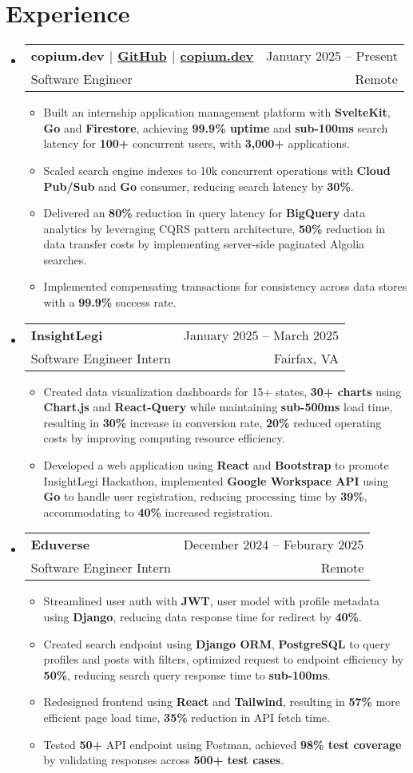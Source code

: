 \documentclass[letterpaper,11pt]{article}
\makeatletter
\newcommand{\resumeItem}[1]{
  \item\small{
    {#1 \vspace{0pt}}
  }
}
\newcommand{\resumeSubheading}[4]{
    \item
    \begin{tabular*}{0.985\textwidth}[t]{l@{\extracolsep{\fill}}r@{\hspace{-0.1in}}}
        \small{\textbf{#1}} & \small{#2} \\
        \small#3 & \small #4 \\
    \end{tabular*}\vspace{-5pt}
}
\newcommand{\resumeSubHeadingListStart}{\begin{itemize}[leftmargin=0.00in, rightmargin=-0.2in, label={}]\vspace{1pt}}
\newcommand{\resumeSubHeadingListEnd}{\end{itemize}\vspace{-5pt}}
\newcommand{\resumeItemListStart}{\begin{itemize}[leftmargin=0.15in, rightmargin=0.15in]}
\newcommand{\resumeItemListEnd}{\end{itemize}\vspace{-10pt}}
\makeatother
\begin{document}
\section{Experience}

\resumeSubHeadingListStart
\resumeSubheading
{copium.dev $|$ \textnormal{\href{https://github.com/copium-dev/copium}{GitHub}} $|$ \textnormal{\href{https://www.copium.dev}{copium.dev}}} {January 2025 -- Present}
{Software Engineer} {Remote}
\resumeItemListStart 
\resumeItem{Built an internship application management platform with \textbf{SvelteKit}, \textbf{Go} and \textbf{Firestore}, achieving \textbf{99.9\% uptime} and \textbf{sub-100ms} search latency for \textbf{100+} concurrent users, with \textbf{3,000+} applications.}
\resumeItem{Scaled search engine indexes to 10k concurrent operations with \textbf{Cloud Pub/Sub} and \textbf{Go} consumer, reducing search latency by \textbf{30\%}.}
\resumeItem{Delivered an \textbf{80\%} reduction in query latency for \textbf{BigQuery} data analytics by leveraging CQRS pattern architecture, \textbf{50\%} reduction in data transfer costs by implementing server-side paginated Algolia searches.}
\resumeItem{Implemented compensating transactions for consistency across data stores with a \textbf{99.9\%} success rate.}
\resumeItemListEnd
\resumeSubHeadingListEnd

\resumeSubHeadingListStart
\resumeSubheading
{InsightLegi} {January 2025 -- March 2025}
{Software Engineer Intern} {Fairfax, VA}
\resumeItemListStart 
\resumeItem{Created data visualization dashboards for 15+ states, \textbf{30+ charts} using \textbf{Chart.js} and \textbf{React-Query} while maintaining \textbf{sub-500ms} load time, resulting in \textbf{30\%} increase in conversion rate, \textbf{20\%} reduced operating costs by improving computing resource efficiency.}
\resumeItem{Developed a web application using \textbf{React} and \textbf{Bootstrap} to promote InsightLegi Hackathon, implemented \textbf{Google Workspace API} using \textbf{Go} to handle user registration, reducing processing time by \textbf{39\%}, accommodating to \textbf{40\%} increased registration.}
\resumeItemListEnd
\resumeSubHeadingListEnd

\resumeSubHeadingListStart
\resumeSubheading
{Eduverse} {December 2024 -- Feburary 2025}
{Software Engineer Intern} {Remote}
\resumeItemListStart
\resumeItem{Streamlined user auth with \textbf{JWT}, user model with profile metadata using \textbf{Django}, reducing data response time for redirect by \textbf{40\%}.}
\resumeItem{Created search endpoint using \textbf{Django ORM}, \textbf{PostgreSQL} to query profiles and posts with filters, optimized request to endpoint efficiency by \textbf{50\%}, reducing search query response time to \textbf{sub-100ms}.}
\resumeItem{Redesigned frontend using \textbf{React} and \textbf{Tailwind}, resulting in \textbf{57\%} more efficient page load time, \textbf{35\%} reduction in API fetch time.}
\resumeItem{Tested \textbf{50+} API endpoint using Postman, achieved \textbf{98\% test coverage} by validating responses across \textbf{500+ test cases}.}
\resumeItemListEnd
\resumeSubHeadingListEnd
\end{document}
